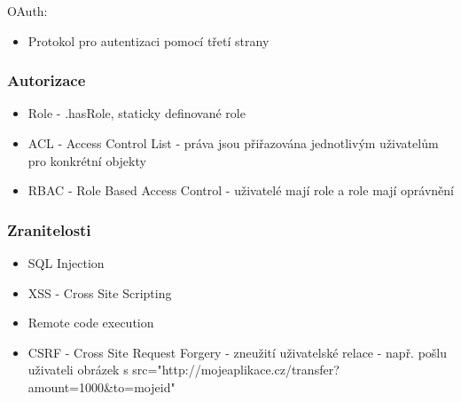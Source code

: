 OAuth:
\begin{itemize}
  \item Protokol pro autentizaci pomocí třetí strany
\end{itemize}

\subsubsection*{Autorizace}
\begin{itemize}
  \item Role - .hasRole, staticky definované role
  \item ACL - Access Control List - práva jsou přiřazována jednotlivým uživatelům pro konkrétní objekty 
  \item RBAC - Role Based Access Control - uživatelé mají role a role mají oprávnění
\end{itemize}

\subsubsection*{Zranitelosti}

\begin{itemize}
  \item SQL Injection
  \item XSS - Cross Site Scripting
  \item Remote code execution 
  \item CSRF - Cross Site Request Forgery - zneužití uživatelské relace - např. pošlu uživateli obrázek s src="http://mojeaplikace.cz/transfer?amount=1000\&to=mojeid"
\end{itemize}
